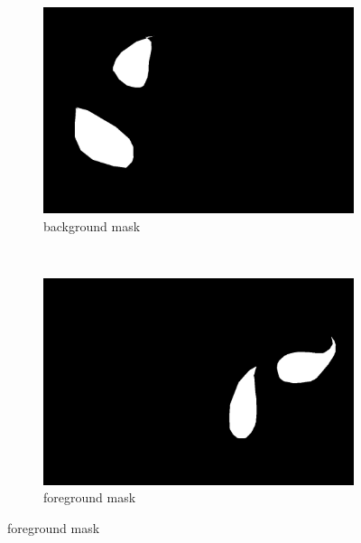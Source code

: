 \documentclass[a4paper]{article}
\begin{document}
\begin{figure}[ht]
	\vspace{2mm}
	\begin{subfigure}[h]{0.48\textwidth}
	\centering
	\includegraphics[width=\textwidth]{imgs/bmask.png}
	\caption*{background mask}
	\end{subfigure}
	~
	\begin{subfigure}[h]{0.48\textwidth}
	\centering
	\includegraphics[width=\textwidth]{imgs/fmask.png}
	\caption*{foreground mask}
	\end{subfigure}
	

\end{figure}
\end{document}
